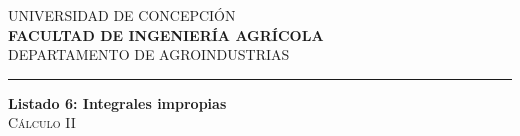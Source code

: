 \documentclass[11pt]{article}
\begin{document}
\thispagestyle{empty}
UNIVERSIDAD DE CONCEPCI\'ON
\\
\textbf{\small FACULTAD DE INGENIER\'IA AGR\'ICOLA}
\\
DEPARTAMENTO DE AGROINDUSTRIAS\\
\rule{16cm}{.5pt}
% 

\vspace{0.5cm}

\begin{center}
  \textbf{Listado 6: Integrales impropias}
  \\
  \textsc{C\'alculo II}
\end{center}
\end{document}
